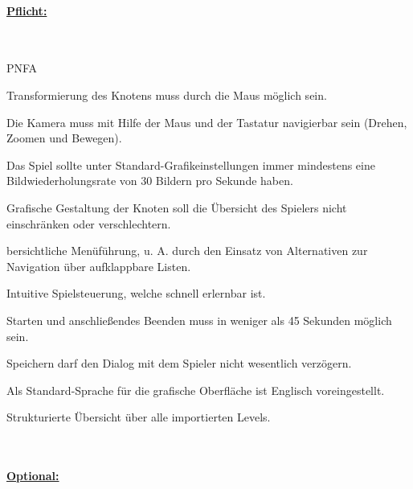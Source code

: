 %
%


%
%
\renewcommand{\K}{}


%
%
\paragraph*{\underline{Pflicht:}}~\\

\begin{ids}{\gls{PNFA\K}} 

 	\id[10] Transformierung des Knotens muss durch die Maus möglich sein.
 	
 	\id[20] Die Kamera muss mit Hilfe der Maus und der Tastatur navigierbar sein (Drehen, Zoomen und Bewegen).
 	
 	\id[30] Das Spiel sollte unter Standard-Grafikeinstellungen immer mindestens eine Bildwiederholungsrate von 30 Bildern pro Sekunde haben.
 	
 	\id[40] Grafische Gestaltung der Knoten soll die Übersicht des Spielers nicht einschränken oder verschlechtern.
 	
 	bersichtliche Menüführung, u. A. durch den Einsatz von Alternativen zur Navigation über aufklappbare Listen.
 	
  	\id[60] Intuitive Spielsteuerung, welche schnell erlernbar ist.
  	
  	\id[70] Starten und anschließendes Beenden muss in weniger als 45 Sekunden möglich sein.
  	
  	\id[80] Speichern darf den Dialog mit dem Spieler nicht wesentlich verzögern.
  	
  	\id[90] Als Standard-Sprache für die grafische Oberfläche ist Englisch voreingestellt.
  	
  	\id[100] Strukturierte Übersicht über alle importierten Levels.
	
\end{ids}

~\\


%
%
\paragraph*{\underline{Optional:}}~\\


